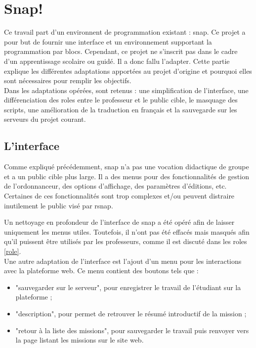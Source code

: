 \section{Snap!}
\label{solution SNAP}
Ce travail part d'un environnent de programmation existant : \gls{snap}. Ce projet a pour but de fournir une interface et un environnement supportant la programmation par \glspl{bloc}. Cependant, ce projet ne s'inscrit pas dans le cadre d'un apprentissage scolaire ou guidé. Il a donc fallu l'adapter. Cette partie explique les différentes adaptations apportées au projet d'origine et pourquoi elles sont nécessaires pour remplir les objectifs.\\

Dans les adaptations opérées, sont retenus : une simplification de l'interface, une différenciation des \glspl{role} entre le professeur et le public cible, le masquage des \glspl{script}, une amélioration de la traduction en français et la sauvegarde sur les serveurs du projet courant.

\subsection{L'interface}
\label{interface}
Comme expliqué précédemment, \gls{snap} n'a pas une vocation didactique de groupe et a un public cible plus large. Il a des menus pour des fonctionnalités de gestion de l'ordonnanceur, des options d'affichage, des paramètres d'éditions, etc. Certaines de ces fonctionnalités sont trop complexes et/ou peuvent distraire inutilement le public visé par \gls{rsnap}.

Un nettoyage en profondeur de l'interface de \gls{snap} a été opéré afin de laisser uniquement les menus utiles. Toutefois, il n'ont pas été effacés mais masqués afin qu'il puissent être utilisés par les professeurs, comme il est discuté dans les \glspl{role} \ref{role}.\\

Une autre adaptation de l'interface est l'ajout d'un menu pour les interactions avec la plateforme web. Ce menu contient des boutons tels que :
\begin{itemize}
  \item "sauvegarder sur le serveur", pour enregistrer le travail de l'étudiant sur la plateforme ;
  \item "description", pour permet de retrouver le résumé introductif de la \gls{mission} ;
  \item "retour à la liste des missions", pour sauvegarder le travail puis renvoyer vers la page listant les \glspl{mission} sur le site web.
\end{itemize}

